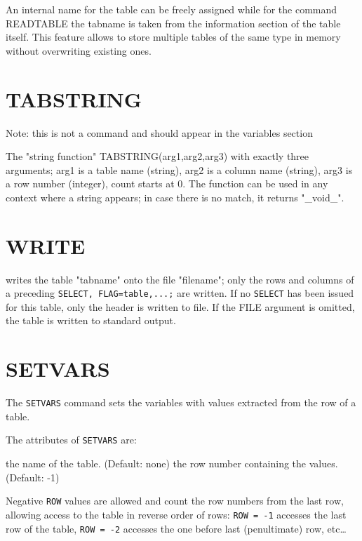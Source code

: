 An internal name for the table can be freely assigned while for the
command READTABLE the tabname is taken from the information section of
the table itself.  
This feature allows to store multiple tables of the same type in memory without
overwriting existing ones.   

\section{TABSTRING}
\label{sec:tabstring}
Note: this is not a command and should appear in the variables section

The "string function" TABSTRING(arg1,arg2,arg3) with exactly  three
arguments; arg1 is a table name (string), arg2 is a column name
(string), arg3 is a row number (integer), count starts at 0. The
function can be used in any context where a string appears; in case
there is no match, it returns "\_void\_".  

\section{WRITE}
\label{sec:write}
writes the table "tabname" onto the file "filename"; only the rows and
columns of a preceding \texttt{SELECT, FLAG=table,...;} are written. 
If no \texttt{SELECT} has been issued for this table, only the header is
written to file.
If the FILE argument is omitted, the table is written to standard output.  



\section{SETVARS}
\label{sec:setvars}

The \texttt{SETVARS} command sets the variables with values extracted
from the row of a table.


The attributes of \texttt{SETVARS} are:
\begin{madlist}
   the name of the table. (Default: none)
   the row number containing the values. (Default: -1)
\end{madlist}

Negative \texttt{ROW} values are allowed and count the row numbers from
the last row, allowing access to the table in reverse order of rows:
\texttt{ROW~=~-1} accesses the last row of the table,
\texttt{ROW~=~-2} accesses the one before last (penultimate) row,
etc\ldots  

